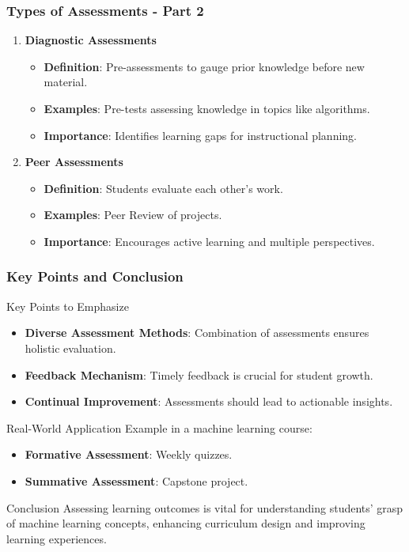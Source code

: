 \documentclass[aspectratio=169]{beamer}
\begin{document}
\begin{frame}[fragile]
    \frametitle{Types of Assessments - Part 2}
    \begin{enumerate}[resume]
        \item \textbf{Diagnostic Assessments}
            \begin{itemize}
                \item \textbf{Definition}: Pre-assessments to gauge prior knowledge before new material.
                \item \textbf{Examples}: Pre-tests assessing knowledge in topics like algorithms.
                \item \textbf{Importance}: Identifies learning gaps for instructional planning.
            \end{itemize}

        \item \textbf{Peer Assessments}
            \begin{itemize}
                \item \textbf{Definition}: Students evaluate each other's work.
                \item \textbf{Examples}: Peer Review of projects.
                \item \textbf{Importance}: Encourages active learning and multiple perspectives.
            \end{itemize}
    \end{enumerate}
\end{frame}

\begin{frame}[fragile]
    \frametitle{Key Points and Conclusion}
    \begin{block}{Key Points to Emphasize}
        \begin{itemize}
            \item \textbf{Diverse Assessment Methods}: Combination of assessments ensures holistic evaluation.
            \item \textbf{Feedback Mechanism}: Timely feedback is crucial for student growth.
            \item \textbf{Continual Improvement}: Assessments should lead to actionable insights.
        \end{itemize}
    \end{block}

    \begin{block}{Real-World Application}
        Example in a machine learning course:
        \begin{itemize}
            \item \textbf{Formative Assessment}: Weekly quizzes.
            \item \textbf{Summative Assessment}: Capstone project.
        \end{itemize}
    \end{block}

    \begin{block}{Conclusion}
        Assessing learning outcomes is vital for understanding students' grasp of machine learning concepts, enhancing curriculum design and improving learning experiences.
    \end{block}
\end{frame}
\end{document}
